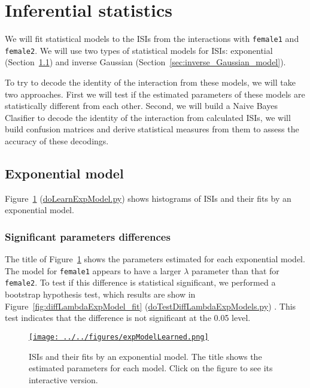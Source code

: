 \documentclass[10pt]{article}
\begin{document}
\section{Inferential statistics}
\label{sec:inferential_statistics}

We will fit statistical models to the ISIs from the interactions with \texttt{female1} and \texttt{female2}. We will use two types of statistical models for ISIs: exponential (Section~\ref{sec:exponential_model}) and inverse Gaussian (Section~\ref{sec:inverse_Gaussian_model}).

To try to decode the identity of the interaction from these models, we will take two approaches. First we will test if the estimated parameters of these models are statistically different from each other. Second, we will build a Naive Bayes Clasifier to decode the identity of the interaction from calculated ISIs, we will build confusion matrices and derive statistical measures from them to assess the accuracy of these decodings.

\subsection{Exponential model}
\label{sec:exponential_model}

Figure~\ref{fig:exponential_model_fit} (\href{https://github.com/joacorapela/singleNeuronSpikesAnalysisTutorial/blob/master/code/scripts/doLearnExpModel.py}{doLearnExpModel.py}) shows histograms of ISIs and
their fits by an exponential model. 

\subsubsection{Significant parameters differences}

The title of Figure~\ref{fig:exponential_model_fit} shows the
parameters estimated for each exponential model. The model for
\texttt{female1} appears to have a larger $\lambda$ parameter than that
for \texttt{female2}. To test if this difference is statistical
significant, we performed a bootstrap hypothesis test, which results
are show in Figure~\ref{fig:diffLambdaExpModel_fit} (\href{https://github.com/joacorapela/singleNeuronSpikesAnalysisTutorial/blob/master/code/scripts/doTestDiffLambdaExpModels.py}{doTestDiffLambdaExpModels.py}) . This test
indicates that the difference is not significant at the 0.05 level.

\begin{figure}
    \href{http://www.gatsby.ucl.ac.uk/~rapela/singleNeuronSpikesAnalysisTutorial/figures/expModelLearned.html}{\texttt{[image: ../../figures/expModelLearned.png]}}
    \caption{ISIs and their fits by an exponential model. The title shows the estimated parameters for each model. Click on the figure to see its interactive version.}
    \label{fig:exponential_model_fit}
\end{figure}
\end{document}
